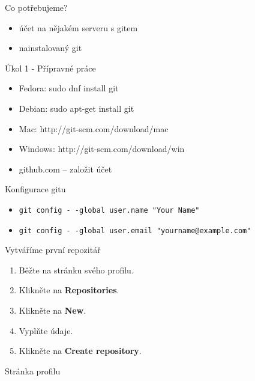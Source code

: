 \documentclass[14pt]{beamer}
\begin{document}
\begin{frame}{Co potřebujeme?}
	\begin{itemize}
		\item účet na nějakém serveru s gitem
		\item nainstalovaný git
	\end{itemize}
\end{frame}

	\begin{frame}{Úkol 1 - Přípravné práce}
		\begin{itemize}
		\item Fedora: sudo dnf install git
		\item Debian: sudo apt-get install git
		\item Mac: http://git-scm.com/download/mac
		\item Windows: http://git-scm.com/download/win
		\item github.com -- založit účet
		\end{itemize}
	\end{frame}

	\begin{frame}{Konfigurace gitu}
		\begin{itemize}
		\item \texttt{git config -\,-global user.name "Your Name"}
		\item \texttt{git config -\,-global user.email "yourname@example.com"}
		\end{itemize}
	\end{frame}

	\begin{frame}{Vytváříme první repozitář}
		\begin{enumerate}
		\item Běžte na stránku svého profilu.
		\item Klikněte na \textbf{Repositories}.
		\item Klikněte na \textbf{New}.
		\item Vyplňte údaje.
		\item Klikněte na \textbf{Create repository}.
		\end{enumerate}
	\end{frame}

	\begin{frame}{Stránka profilu}
        \begin{center}
        \end{center}
	\end{frame}
\end{document}
